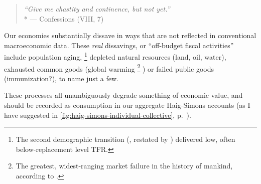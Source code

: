 \begin{quote}
	\emph{``Give me chastity and continence, but not yet.''}
	\\*
	--- \citeauthor{St.AugusteofHippo397} Confessions (VIII, 7)
\end{quote}

Our economies substantially dissave in ways that are not reflected in conventional macroeconomic data.
These \emph{real} dissavings, or ``off-budget fiscal activities'' \cite[49]{Bonker2006} include population aging,
\footnote{
	The second demographic transition (\citealt{Davis1945}, restated by \citealt{Caldwell-1976-aa}) delivered low, often below-replacement level \gls{TFR}.
}
depleted natural resources (land, oil, water), exhausted common goods (global warming
\footnote{
	The greatest, widest-ranging market failure in the history of mankind, according to \cite{Stern-2006-aa}.
}
) or failed public goods (immunization?), to name just a few.

These processes all unambiguously degrade something of economic value, and should be recorded as consumption in our aggregate Haig-Simons accounts (as I have suggested in \autoref{fig:haig-simons-individual-collective}, p.~\pageref{fig:haig-simons-individual-collective}).

